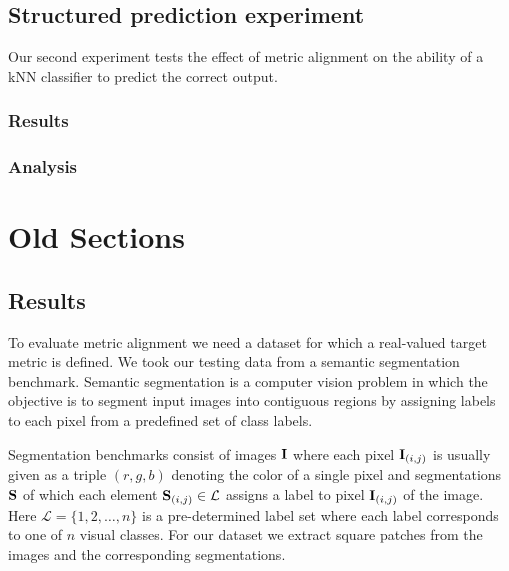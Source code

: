 \section{Structured prediction experiment}

Our second experiment tests the effect of metric alignment on the ability of a \acf{kNN} classifier to predict the correct output. 


\subsection{Results}


\subsection{Analysis}





































\newpage

\chapter*{Old Sections}


\section{Results}

To evaluate metric alignment we need a dataset for which a real-valued target metric is defined. We took our testing data from a semantic segmentation benchmark. Semantic segmentation is a computer vision problem in which the objective is to segment input images into contiguous regions by assigning labels to each pixel from a predefined set of class labels. 


Segmentation benchmarks consist of images $\mathbf{I}$ where each pixel $\mathbf{I}_{(i,j)}$ is usually given as a triple $(r,g,b)$ denoting the color of a single pixel and segmentations $\mathbf{S}$ of which each element  $\mathbf{S}_{(i,j)} \in \mathcal{L}$ assigns a label to pixel $\mathbf{I}_{(i,j)}$ of the image. Here $\mathcal{L} = \{1, 2, \ldots, n\}$ is a pre-determined label set  where each label corresponds to one of $n$ visual classes. For our dataset we extract square patches from the images and the corresponding segmentations.


